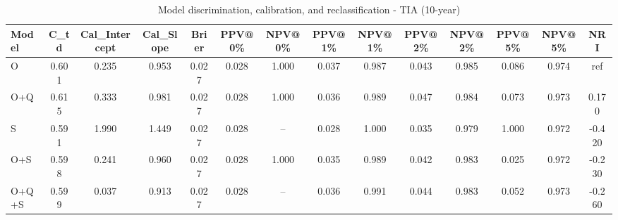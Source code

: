 \begin{table}[htbp]
\centering
\small
\caption{Model discrimination, calibration, and reclassification - TIA (10-year)}
\label{tab:perf_tia_10y}
\begin{tabular}{lccccccccccccc}
\toprule
Model & C\_td & Cal\_Intercept & Cal\_Slope & Brier & PPV@0\% & NPV@0\% & PPV@1\% & NPV@1\% & PPV@2\% & NPV@2\% & PPV@5\% & NPV@5\% & NRI \\
\midrule
O & 0.601 & 0.235 & 0.953 & 0.027 & 0.028 & 1.000 & 0.037 & 0.987 & 0.043 & 0.985 & 0.086 & 0.974 & ref \\
O+Q & 0.615 & 0.333 & 0.981 & 0.027 & 0.028 & 1.000 & 0.036 & 0.989 & 0.047 & 0.984 & 0.073 & 0.973 & 0.170 \\
S & 0.591 & 1.990 & 1.449 & 0.027 & 0.028 & -- & 0.028 & 1.000 & 0.035 & 0.979 & 1.000 & 0.972 & -0.420 \\
O+S & 0.598 & 0.241 & 0.960 & 0.027 & 0.028 & 1.000 & 0.035 & 0.989 & 0.042 & 0.983 & 0.025 & 0.972 & -0.230 \\
O+Q+S & 0.599 & 0.037 & 0.913 & 0.027 & 0.028 & -- & 0.036 & 0.991 & 0.044 & 0.983 & 0.052 & 0.973 & -0.260 \\
\bottomrule
\end{tabular}
\end{table}